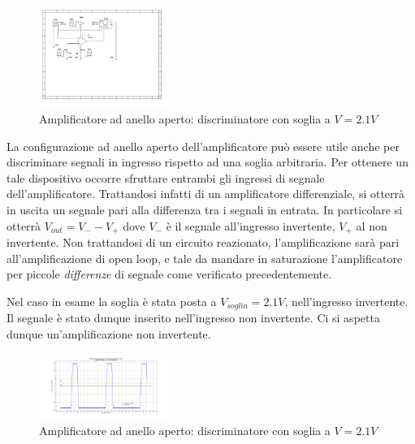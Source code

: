 \documentclass[journal]{IEEEtran}
\begin{document}
\begin{figure}[H]%
\begin {center}
\includegraphics[width=0.38\textwidth]{sch-simulations/output/OPA-biased.pdf}
\caption{Amplificatore ad anello aperto: discriminatore con soglia a $V = 2.1 V$}
\label{fig:oscilloscope}
\end {center}
\end{figure}

La configurazione ad anello aperto dell'amplificatore può essere utile anche per discriminare segnali in ingresso rispetto ad una soglia arbitraria.
Per ottenere un tale dispositivo occorre sfruttare entrambi gli ingressi di segnale dell'amplificatore. Trattandosi infatti di un amplificatore differenziale, si otterrà in
uscita un segnale pari alla differenza tra i segnali in entrata. In particolare si otterrà $V_{out} = V_{-} - V_{+}$ dove $V_{-}$ è il segnale all'ingresso invertente, $V_{+
}$ al non invertente.
Non trattandosi di un circuito reazionato, l'amplificazione sarà pari all'amplificazione di open loop, e tale da mandare in saturazione l'amplificatore per piccole
\textit{differenze} di segnale come verificato precedentemente.

Nel caso in esame la soglia è stata posta a $V_{soglia} = 2.1 V$, nell'ingresso invertente.
Il segnale è stato dunque inserito nell'ingresso non invertente. Ci si aspetta dunque un'amplificazione non invertente.

\begin{figure}[H]%
\begin {center}
\includegraphics[width=0.38\textwidth]{analysis/output/OPA-open-loop-biased_threshold.pdf}
\caption{Amplificatore ad anello aperto: discriminatore con soglia a $V = 2.1 V$}
\label{fig:oscilloscope}
\end {center}
\end{figure}
\end{document}
